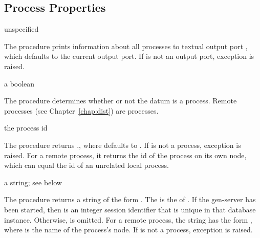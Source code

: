 \subsection {Process Properties}

\begin{procedure}
\end{procedure}
\returns{} unspecified

The  procedure prints information about all processes to
textual output port , which defaults to the current output
port. If  is not an output port, exception  is raised.

\begin{procedure}
\end{procedure}
\returns{} a boolean

The  procedure determines whether or not the datum
 is a process. Remote processes (see Chapter~\ref{chap:dist})
are processes.

\begin{procedure}
\end{procedure}
\returns{} the process id

The  procedure returns .,
where  defaults to . If  is not
a process, exception  is
raised. For a remote process, it returns the id of the process on its
own node, which can equal the id of an unrelated local process.

\begin{procedure}
\end{procedure}
\returns{} a string; see below

The  procedure returns a string of the form
.
The  is the  of .
If the \hyperref[chap:log-db]{} gen-server has been started, then
 is an integer session identifier that is unique in that
database instance.
Otherwise,  is omitted.
For a remote process, the string has the form
, where  is the name of
the process's node.
If  is not a process, exception  is raised.

